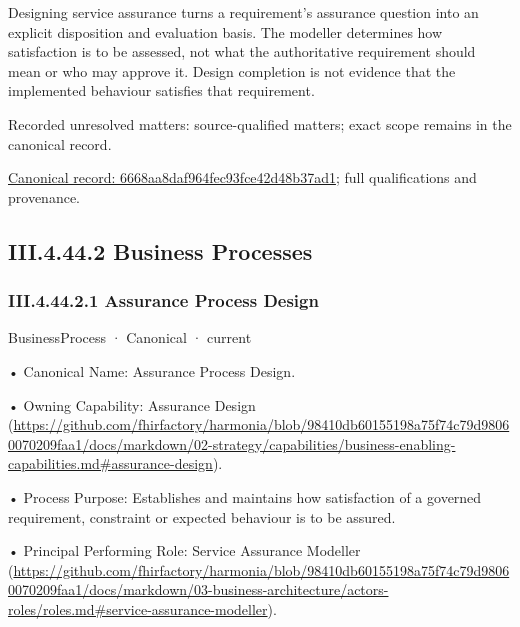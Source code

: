 Designing service assurance turns a requirement's assurance question into an explicit disposition and evaluation basis. The modeller determines how satisfaction is to be assessed, not what the authoritative requirement should mean or who may approve it. Design completion is not evidence that the implemented behaviour satisfies that requirement.


{\small Recorded unresolved matters: source-qualified matters; exact scope remains in the canonical record.}\par
{\footnotesize \href{../../../../continuum/business/business-function/6668aa8daf964fec93fce42d48b37ad1.md}{Canonical record: 6668aa8daf964fec93fce42d48b37ad1}; full qualifications and provenance.}\par
\subsection*{III.4.44.2 Business Processes}
\label{navigation:III.4.44.2}

\subsubsection*{III.4.44.2.1 Assurance Process Design}
\label{navigation:III.4.44.2.1}

\label{element:aec3177dcdd84961814f2ba4f688ad33}
{\small BusinessProcess · Canonical · current}\par

•
Canonical Name: Assurance Process Design.



•
Owning Capability: Assurance Design (\url{https://github.com/fhirfactory/harmonia/blob/98410db60155198a75f74c79d98060070209faa1/docs/markdown/02-strategy/capabilities/business-enabling-capabilities.md#assurance-design}).



•
Process Purpose: Establishes and maintains how satisfaction of a governed requirement, constraint or expected behaviour is to be assured.



•
Principal Performing Role: Service Assurance Modeller (\url{https://github.com/fhirfactory/harmonia/blob/98410db60155198a75f74c79d98060070209faa1/docs/markdown/03-business-architecture/actors-roles/roles.md#service-assurance-modeller}).



